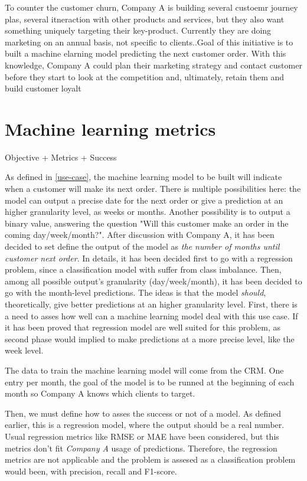  
 To counter the customer churn, Company A is building several custoemr journey plas, several itneraction with other products and services, but they also want something uniquely targeting their key-product. Currently they are doing marketing on an annual basis, not specific to clients..Goal of this initiative is to built a machine elarning model predicting the next customer order. With this knowledge, Company A could plan their marketing strategy and contact customer before they start to look at the competition and, ultimately, retain them and build customer loyalt
 


\section{Machine learning metrics}
Objective + Metrics + Success

As defined in \ref{use-case}, the machine learning model to be built will indicate when a customer will make its next order. There is multiple possibilities here: the model can output a precise date for the next order or give a prediction at an higher granularity level, as weeks or months. Another possibility is to output a binary value, answering the question "Will this customer make an order in the coming day/week/month?". After discussion with Company A, it has been decided to set define the output of the model as \textit{the number of months until customer next order}. In details, it has been decided first to go with a regression problem, since a classification model with suffer from class imbalance. Then, among all possible output's granularity (day/week/month), it has been decided to go with the month-level predictions. The ideas is that the model \textit{should}, theoretically, give better predictions at an higher granularity level. First, there is a need to asses how well can a machine learning model deal with this use case. If it has been proved that regression model are well suited for this problem, as second phase would implied to make predictions at a more precise level, like the week level.


The data to train the machine learning model will come from the CRM. One entry per month, the goal of the model is to be runned at the beginning of each month so Company A knows which clients to target.


Then, we must define how to asses the success or not of a model. As defined earlier, this is a regression model, where the output should be a real number. Usual regression metrics like RMSE or MAE have been considered, but this metrics don't fit \textit{Company A} usage of predictions. Therefore, the regression metrics are not applicable and the problem is assesed as a classification problem would been, with precision, recall and F1-score. 


